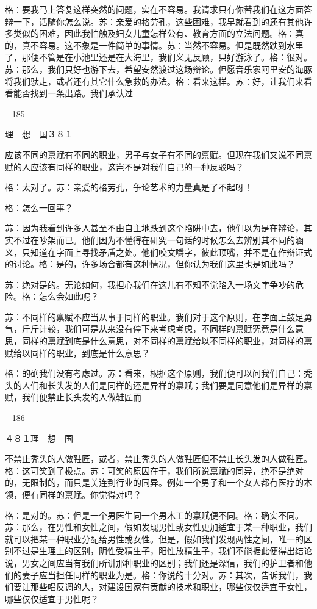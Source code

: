 \documentclass[11pt,oneside]{book}
\begin{document}
\begin{common-format}
    格：要我马上答复这样突然的问题，实在不容易。我请求只有你替我们在这方面答辩一下，话随你怎么说。苏：亲爱的格劳孔，这些困难，我早就看到的还有其他许多类似的困难，因此我怕触及妇女儿童怎样公有、教育方面的立法问题。格：真的，真不容易。这不象是一件简单的事情。苏：当然不容易。但是既然跌到水里了，那便不管是在小池里还是在大海里，我们义无反顾，只好游泳了。格：很对。苏：那么，我们只好也游下去，希望安然渡过这场辩论。但愿音乐家阿里安的海豚将我们驮走，或者还有其它什么急救的办法。格：看来这样。苏：好，让我们来看看能否找到一条出路。我们承认过

    

-- 185

    理　想　国３８１

    应该不同的禀赋有不同的职业，男子与女子有不同的禀赋。但现在我们又说不同禀赋的人应该有同样的职业，这岂不是对我们自己的一种反驳吗？

    格：太对了。苏：亲爱的格劳孔，争论艺术的力量真是了不起呀！

    格：怎么一回事？

    苏：因为我看到许多人甚至不由自主地跌到这个陷阱中去，他们以为是在辩论，其实不过在吵架而已。他们因为不懂得在研究一句话的时候怎么去辨别其不同的涵义，只知道在字面上寻找矛盾之处。他们咬文嚼字，彼此顶嘴，并不是在作辩证式的讨论。格：是的，许多场合都有这种情况，但你认为我们这里也是如此吗？

    苏：绝对是的。无论如何，我担心我们在这儿有不知不觉陷入一场文字争吵的危险。格：怎么会如此呢？

    苏：不同样的禀赋不应当从事于同样的职业。我们对于这个原则，在字面上鼓足勇气，斤斤计较，我们可是从来没有停下来考虑考虑，不同样的禀赋究竟是什么意思，同样的禀赋到底是什么意思，对不同样的禀赋给以不同样的职业，对同样的禀赋给以同样的职业，到底是什么意思？

    格：的确我们没有考虑过。苏：看来，根据这个原则，我们便可以问我们自己：秃头的人们和长头发的人们是同样的还是异样的禀赋；我们要是同意他们是异样的禀赋，我们便禁止长头发的人做鞋匠而

    

-- 186

    ４８１理　想　国

    不禁止秃头的人做鞋匠，或者，禁止秃头的人做鞋匠但不禁止长头发的人做鞋匠。格：这可笑到了极点。苏：可笑的原因在于，我们所说禀赋的同异，绝不是绝对的，无限制的，而只是关连到行业的同异。例如一个男子和一个女人都有医疗的本领，便有同样的禀赋。你觉得对吗？

    格：是对的。苏：但是一个男医生同一个男木工的禀赋便不同。格：确实不同。苏：那么，在男性和女性之间，假如发现男性或女性更加适宜于某一种职业，我们就可以把某一种职业分配给男性或女性。但是，假如我们发现两性之间，唯一的区别不过是生理上的区别，阴性受精生子，阳性放精生子，我们不能据此便得出结论说，男女之间应当有我们所讲那种职业的区别；我们还是深信，我们的护卫者和他们的妻子应当担任同样的职业为是。格：你说的十分对。苏：其次，告诉我们，我们要让那些唱反调的人，对建设国家有贡献的技术和职业，哪些仅仅适宜于女性，哪些仅仅适宜于男性呢？


\end{common-format}
\end{document}
